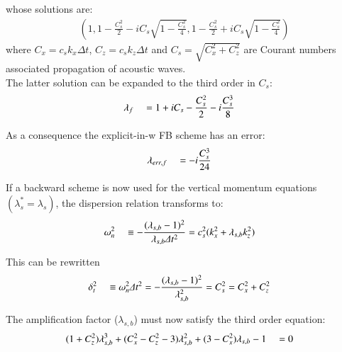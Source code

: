 \documentclass[a4paper,11pt]{article}
\begin{document}
whose solutions are:
\begin{equation}
   \begin{split}
    \displaystyle
    (1,1-\frac{C_s^2}{2}-i C_s \sqrt{1-\frac{C_s^2}{4}}
      ,1-\frac{C_s^2}{2}+i C_s \sqrt{1-\frac{C_s^2}{4}})
   \end{split}
\end{equation}
where $C_{x}=c_s k_x\Delta t$, $C_{z}=c_s k_z\Delta t$ and $C_s=\sqrt{C_{x}^2+C_{z}^2}$ are Courant numbers associated 
propagation of acoustic waves.\\

The latter solution can be expanded to the third order in $C_s$:
\begin{equation}
   \begin{split}
    \displaystyle   
    & \lambda_f && = 1 + i C_s - \frac{C_s^2}{2} - i\frac{C_s^3}{8}
   \end{split}
   \label{dispers_ac}
\end{equation}

As a consequence the explicit-in-w FB scheme has an error:
\begin{equation}
   \begin{split}
    \displaystyle   
    & \lambda_{err,f} && = - i\frac{C_s^3}{24}
   \end{split}
\end{equation}


If a backward scheme is now used for the vertical momentum equations $(\lambda_s^*=\lambda_s)$, the dispersion relation transforms to:
\begin{equation}
   \begin{split}
    \displaystyle   
     &\omega_n^2 &&\equiv -\frac{(\lambda_{s,b}-1)^2}{\lambda_{s,b}\Delta t^2} = c_s^2 (k_x^2+\lambda_{s,b}k_z^2)
   \end{split}
   \label{dispers_ac}
\end{equation}

This can be rewritten
\begin{equation}
   \begin{split}
    \displaystyle   
     &\delta_t^2 &&\equiv \omega_n^2 \Delta t^2 =-\frac{(\lambda_{s,b}-1)^2}{\lambda_{s,b}^2} = C_{s}^2 = C_{x}^2+C_{z}^2
   \end{split}
   \label{dispers_ac}
\end{equation}

The amplification factor ($\lambda_{s,b}$) must now satisfy the third order equation:
\begin{equation}
   \begin{split}
    \displaystyle
    &(1+C_{z}^2)\lambda_{s,b}^3+(C_{x}^2-C_{z}^2-3)\lambda_{s,b}^2+(3-C_{x}^2)\lambda_{s,b}-1 &&=0 
   \end{split}
\end{equation}
\end{document}
